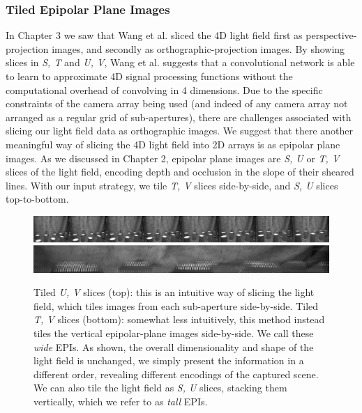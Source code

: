 \subsubsection{Tiled Epipolar Plane Images}
In Chapter 3 we saw that Wang et al. \cite{wang2016lfcnn} sliced the 4D light field first as perspective-projection images, and secondly as orthographic-projection images. By showing slices in \textit{S, T} and \textit{U, V}, Wang et al. suggests that a convolutional network is able to learn to approximate 4D signal processing functions without the computational overhead of convolving in 4 dimensions. Due to the specific constraints of the camera array being used (and indeed of any camera array not arranged as a regular grid of sub-apertures), there are challenges associated with slicing our light field data as orthographic images. We suggest that there another meaningful way of slicing the 4D light field into 2D arrays is as epipolar plane images. As we discussed in Chapter 2, epipolar plane images are \textit{S, U} or \textit{T, V} slices of the light field, encoding depth and occlusion in the slope of their sheared lines. With our input strategy, we tile \textit{T, V} slices side-by-side, and \textit{S, U} slices top-to-bottom. 

\begin{figure}[h]
    \centering 
    \includegraphics[width=6in]{images/epitile_3.png}
    \includegraphics[width=6in]{images/epitile_2.png}
    \caption[Two different ways of slicing the light field]{Tiled \textit{U, V} slices (top): this is an intuitive way of slicing the light field, which tiles images from each sub-aperture side-by-side. Tiled \textit{T, V} slices (bottom): somewhat less intuitively, this method instead tiles the vertical epipolar-plane images side-by-side. We call these \textit{wide} EPIs. As shown, the overall dimensionality and shape of the light field is unchanged, we simply present the information in a different order, revealing different encodings of the captured scene. We can also tile the light field as \textit{S, U} slices, stacking them vertically, which we refer to as \textit{tall} EPIs.}
\end{figure}

